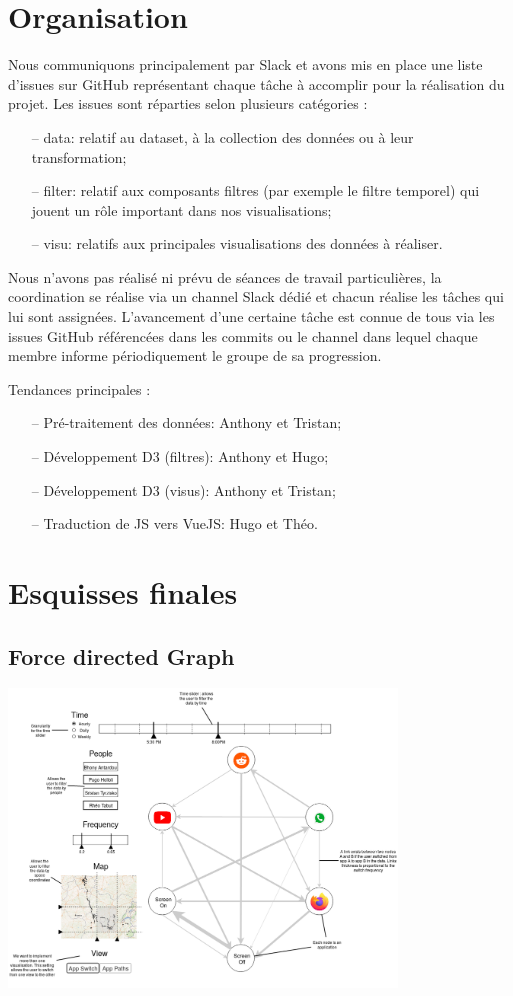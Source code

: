 \documentclass[a4paper, 11pt]{article}
\begin{document}
    \section{Organisation}
    Nous communiquons principalement par Slack et avons mis en place une liste d'issues sur GitHub représentant chaque tâche à accomplir pour la réalisation du projet. Les issues sont réparties selon plusieurs catégories :
    \begin{itemize}
    \item[--] data: relatif au dataset, à la collection des données ou à leur transformation;
    \item[--] filter: relatif aux composants filtres (par exemple le filtre temporel) qui jouent un rôle important dans nos visualisations;
    \item[--] visu: relatifs aux principales visualisations des données à réaliser.
    \end{itemize}
    
    Nous n'avons pas réalisé ni prévu de séances de travail particulières, la coordination se réalise via un channel Slack dédié et chacun réalise les tâches qui lui sont assignées. L'avancement d'une certaine tâche est connue de tous via les issues GitHub référencées dans les commits ou le channel dans lequel chaque membre informe périodiquement le groupe de sa progression.
    
    Tendances principales :
    \begin{itemize}
    \item[--] Pré-traitement des données: Anthony et Tristan;
    \item[--] Développement D3 (filtres): Anthony et Hugo;
    \item[--] Développement D3 (visus): Anthony et Tristan;
    \item[--] Traduction de JS vers VueJS: Hugo et Théo.
    \end{itemize}

    \section{Esquisses finales}
        \subsection{Force directed Graph}
		\begin{center} \includegraphics[height=300px]{sketches/AppGraph} \end{center}
		
\end{document}
